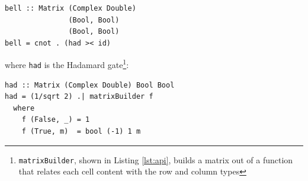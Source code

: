 \documentclass[sigplan,screen]{acmart}\settopmatter{}
\newcommand{\hs}{\texttt}
\begin{document}
\begin{verbatim}
bell :: Matrix (Complex Double) 
               (Bool, Bool) 
               (Bool, Bool)
bell = cnot . (had >< id)
\end{verbatim}
where \hs{had} is the Hadamard gate\footnote{\hs{matrixBuilder}, shown in Listing \ref{lst:api}, builds a matrix out of a function that relates each cell content with the row and column types}:
\begin{verbatim}
had :: Matrix (Complex Double) Bool Bool
had = (1/sqrt 2) .| matrixBuilder f
  where
    f (False, _) = 1
    f (True, m)  = bool (-1) 1 m
\end{verbatim}
%
%
%
\end{document}
